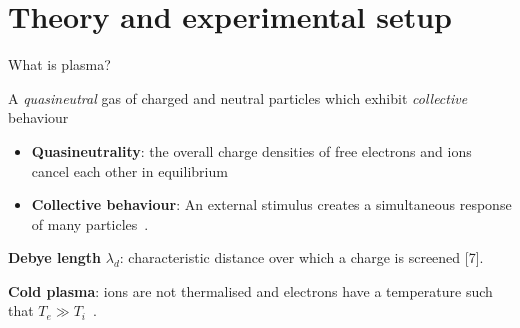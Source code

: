 \documentclass[10pt]{beamer}
\begin{document}
\section{Theory and experimental setup}
\begin{frame}{What is plasma?}
    \begin{definition}
        A \emph{quasineutral} gas of charged and neutral particles which exhibit \emph{collective} behaviour\, 
        
    \end{definition}
    \vspace{0.3cm}
    \begin{itemize}
        \item \textbf{Quasineutrality}: the overall charge densities of free electrons and ions cancel each other in equilibrium

        \item \textbf{Collective behaviour}: 
            An external stimulus creates a simultaneous response of many particles\, .
    \end{itemize}
    \vspace{0.4cm}
    \textbf{Debye length} $\lambda_d$: characteristic distance over which a charge is screened [7].
    
    \vspace{0.2cm}
    \textbf{Cold plasma}: ions are not thermalised and electrons have a temperature such that $T_e \gg T_i$\, .

\end{frame}
\end{document}
